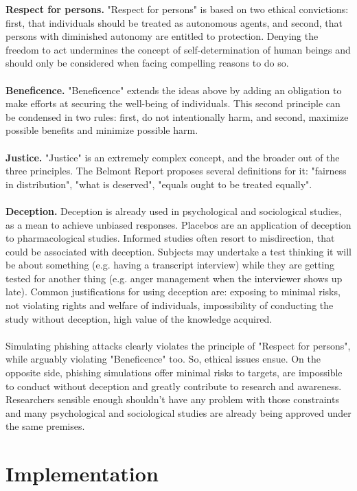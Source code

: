 \documentclass[a4paper]{article}
\begin{document}
\noindent
\textbf{Respect for persons.} "Respect for persons" is based on two ethical convictions: first, that individuals should be treated as autonomous agents, and second, that persons with diminished autonomy are entitled to protection. Denying the freedom to act undermines the concept of self-determination of human beings and should only be considered when facing compelling reasons to do so. 
\\ \\
\textbf{Beneficence.} "Beneficence" extends the ideas above by adding an obligation to make efforts at securing the well-being of individuals. This second principle can be condensed in two rules: first, do not intentionally harm, and second, maximize possible benefits and minimize possible harm.
\\ \\
\textbf{Justice.} "Justice" is an extremely complex concept, and the broader out of the three principles. The Belmont Report proposes several definitions for it: "fairness in distribution", "what is deserved", "equals ought to be treated equally".
\\ \\
\textbf{Deception.} Deception is already used in psychological and sociological studies, as a mean to achieve unbiased responses. Placebos are an application of deception to pharmacological studies. Informed studies often resort to misdirection, that could be associated with deception. Subjects may undertake a test thinking it will be about something (e.g. having a transcript interview) while they are getting tested for another thing (e.g. anger management when the interviewer shows up late). Common justifications for using deception are: exposing to minimal risks, not violating rights and welfare of individuals, impossibility of conducting the study without deception, high value of the knowledge acquired.
\\ \\
Simulating phishing attacks clearly violates the principle of "Respect for persons", while arguably violating "Beneficence" too. So, ethical issues ensue. On the opposite side, phishing simulations offer minimal risks to targets, are impossible to conduct without deception and greatly contribute to research and awareness. Researchers sensible enough shouldn't have any problem with those constraints and many psychological and sociological studies are already being approved under the same premises.

\newpage

\section{Implementation}
\end{document}
